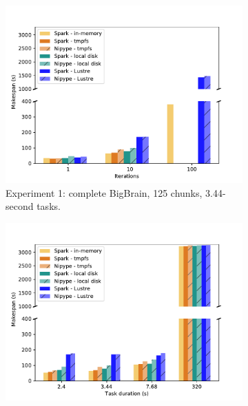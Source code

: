 
\begin{figure}

\begin{subfigure}{0.5\columnwidth}
    \centering
    \captionsetup{width=.85\linewidth}
    \includegraphics[width=\columnwidth]{figures/part2-chp1/iterations.pdf}%
    \caption{Experiment 1: complete BigBrain, 125 chunks, 3.44-second tasks.}\label{fig:iterations}
\end{subfigure}
\begin{subfigure}{0.5\columnwidth}
    \centering
    \captionsetup{width=.85\linewidth}
    \includegraphics[width=\linewidth]{figures/part2-chp1/cputime.pdf}

\end{subfigure}
\end{figure}
